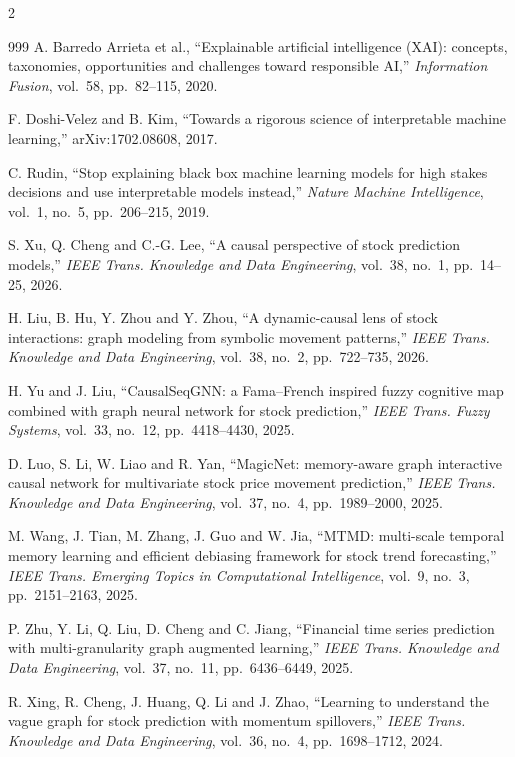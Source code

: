 \begin{footnotesize}
\begin{multicols}{2}
\begin{thebibliography}{999}
 A. Barredo Arrieta et al., ``Explainable artificial intelligence (XAI):
concepts, taxonomies, opportunities and challenges toward responsible AI,'' \emph{Information
Fusion}, vol.~58, pp.~82--115, 2020.

 F. Doshi-Velez and B. Kim, ``Towards a rigorous science of interpretable
machine learning,'' arXiv:1702.08608, 2017.

 C. Rudin, ``Stop explaining black box machine learning models for high stakes
decisions and use interpretable models instead,'' \emph{Nature Machine Intelligence}, vol.~1,
no.~5, pp.~206--215, 2019.

 S. Xu, Q. Cheng and C.-G. Lee, ``A causal perspective of stock prediction
models,'' \emph{IEEE Trans. Knowledge and Data Engineering}, vol.~38, no.~1, pp.~14--25, 2026.

 H. Liu, B. Hu, Y. Zhou and Y. Zhou, ``A dynamic-causal lens of stock
interactions: graph modeling from symbolic movement patterns,'' \emph{IEEE Trans. Knowledge and
Data Engineering}, vol.~38, no.~2, pp.~722--735, 2026.

 H. Yu and J. Liu, ``CausalSeqGNN: a Fama--French inspired fuzzy
cognitive map combined with graph neural network for stock prediction,'' \emph{IEEE Trans. Fuzzy
Systems}, vol.~33, no.~12, pp.~4418--4430, 2025.

 D. Luo, S. Li, W. Liao and R. Yan, ``MagicNet: memory-aware graph
interactive causal network for multivariate stock price movement prediction,'' \emph{IEEE Trans.
Knowledge and Data Engineering}, vol.~37, no.~4, pp.~1989--2000, 2025.

 M. Wang, J. Tian, M. Zhang, J. Guo and W. Jia, ``MTMD: multi-scale temporal
memory learning and efficient debiasing framework for stock trend forecasting,'' \emph{IEEE Trans.
Emerging Topics in Computational Intelligence}, vol.~9, no.~3, pp.~2151--2163, 2025.

 P. Zhu, Y. Li, Q. Liu, D. Cheng and C. Jiang, ``Financial time series
prediction with multi-granularity graph augmented learning,'' \emph{IEEE Trans. Knowledge and Data
Engineering}, vol.~37, no.~11, pp.~6436--6449, 2025.

 R. Xing, R. Cheng, J. Huang, Q. Li and J. Zhao, ``Learning to understand
the vague graph for stock prediction with momentum spillovers,'' \emph{IEEE Trans. Knowledge and
Data Engineering}, vol.~36, no.~4, pp.~1698--1712, 2024.


\end{thebibliography}
\end{multicols}
\end{footnotesize}
